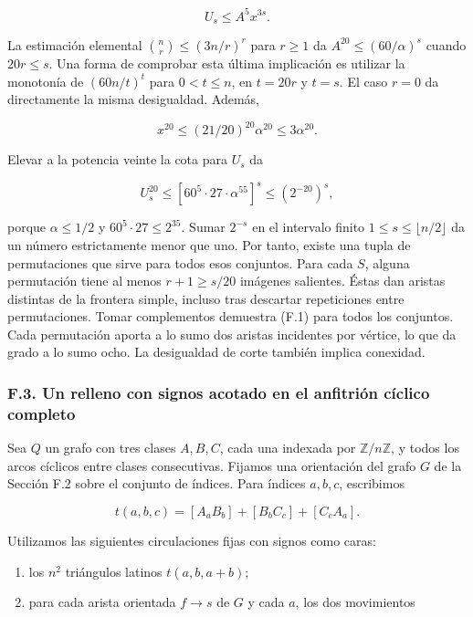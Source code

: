 \documentclass[spanish,11pt,a4paper]{article}
\providecommand{\tightlist}{\setlength{\itemsep}{0pt}\setlength{\parskip}{0pt}}
\begin{document}
\[U_s\le A^5x^{3s}.\]

La estimación elemental \(\binom{n}{r}\le (3n/r)^{r}\) para \(r\ge 1\) da \(A^{20}\le (60/\alpha)^{s}\) cuando \(20r\le s\). Una forma de comprobar esta última implicación es utilizar la monotonía de \((60n/t)^{t}\) para \(0<t\le n\), en \(t=20r\) y \(t=s\). El caso \(r=0\) da directamente la misma desigualdad. Además,

\[x^{20}\le(21/20)^{20}\alpha^{20}\le3\alpha^{20}.\]

Elevar a la potencia veinte la cota para \(U_{s}\) da

\[U_s^{20}\le[60^5\cdot27\cdot\alpha^{55}]^s\le(2^{-20})^s,\]

porque \(\alpha\le 1/2\) y \(60^{5}\cdot 27\le 2^{35}\). Sumar \(2^{-s}\) en el intervalo finito \(1\le s\le \lfloor n/2\rfloor\) da un número estrictamente menor que uno. Por tanto, existe una tupla de permutaciones que sirve para todos esos conjuntos. Para cada \(S\), alguna permutación tiene al menos \(r+1\ge s/20\) imágenes salientes. Éstas dan aristas distintas de la frontera simple, incluso tras descartar repeticiones entre permutaciones. Tomar complementos demuestra (F.1) para todos los conjuntos. Cada permutación aporta a lo sumo dos aristas incidentes por vértice, lo que da grado a lo sumo ocho. La desigualdad de corte también implica conexidad.

\subsubsection{F.3. Un relleno con signos acotado en el anfitrión cíclico completo}\label{f.3.-un-relleno-con-signos-acotado-en-el-anfitriuxf3n-cuxedclico-completo}

Sea \(Q\) un grafo con tres clases \(A,B,C\), cada una indexada por \(\mathbb Z/n\mathbb Z\), y todos los arcos cíclicos entre clases consecutivas. Fijamos una orientación del grafo \(G\) de la Sección F.2 sobre el conjunto de índices. Para índices \(a,b,c\), escribimos

\[t(a,b,c)=[A_aB_b]+[B_bC_c]+[C_cA_a].\]

Utilizamos las siguientes circulaciones fijas con signos como caras:

\begin{enumerate}
\def\labelenumi{\arabic{enumi}.}
\tightlist
\item
  los \(n^{2}\) triángulos latinos \(t(a,b,a+b)\);
\item
  para cada arista orientada \(f\to s\) de \(G\) y cada \(a\), los dos movimientos
\end{enumerate}
\end{document}
